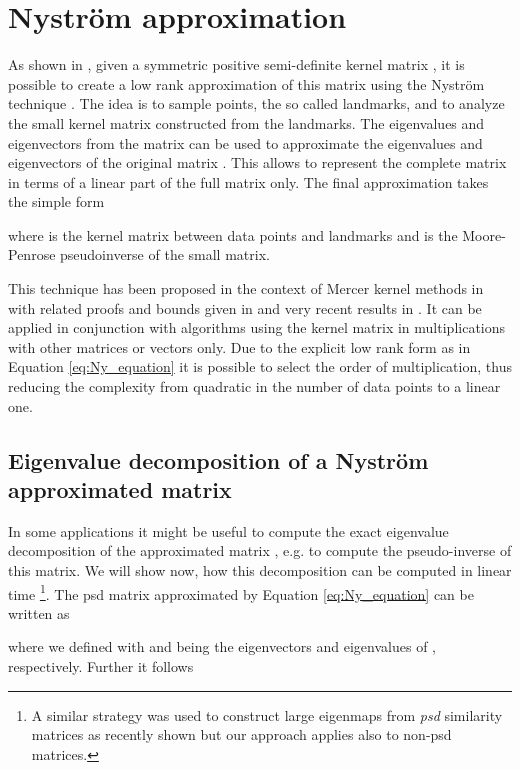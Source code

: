 \documentclass[twoside,11pt]{article}
\begin{document}
\section{Nystr\"om approximation}
\label{sec:ny_approx}
As shown in \cite{DBLP:conf/nips/WilliamsS00}, given a symmetric positive semi-definite kernel matrix ,
it is possible to create a low rank approximation of this matrix
using the Nystr\"om technique \cite{ny_orig}.
The idea is to sample  points, the so called landmarks,
and to analyze the small  kernel matrix 
constructed from the landmarks.
The eigenvalues and eigenvectors from the matrix 
can be used to approximate the eigenvalues and eigenvectors
of the original matrix .
This allows to represent the complete matrix in terms
of a linear part of the full matrix only.
The final approximation takes the simple form

where  is the kernel matrix between  data points and  landmarks
and  is the Moore-Penrose pseudoinverse of the small matrix.

This technique has been proposed
in the context of Mercer kernel methods in \cite{DBLP:conf/nips/WilliamsS00}
with related proofs and bounds given in \cite{DBLP:journals/jmlr/DrineasM05}
and very recent results in \cite{DBLP:journals/corr/abs-1303-1849}.
It can be applied in conjunction with algorithms using the kernel matrix
in multiplications with other matrices or vectors only.
Due to the explicit low rank form as in Equation \eqref{eq:Ny_equation}
it is possible to select the order of multiplication,
thus reducing the complexity
from quadratic in the number of data points to a linear one.

\subsection{Eigenvalue decomposition of a Nystr\"om approximated matrix}\label{sec:eval_decomp}
In some applications it might be useful to compute the exact eigenvalue decomposition
of the approximated matrix ,
e.g. to compute the pseudo-inverse of this matrix.
We will show now, how this decomposition can be computed in linear time
\footnote{A similar strategy was used to construct large eigenmaps from \emph{psd} similarity matrices 
as recently shown \cite{JMLR:v14:talwalkar13a} but our approach applies also to non-psd matrices.}.
The psd matrix approximated by Equation \eqref{eq:Ny_equation} 
can be written as

where we defined 
with  and  being the eigenvectors and eigenvalues
of , respectively.
Further it follows
\end{document}
